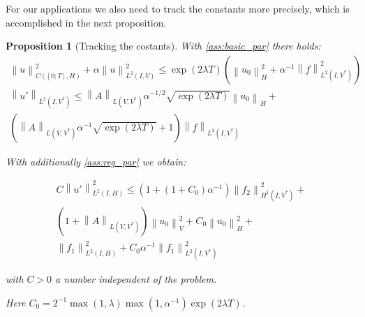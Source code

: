 \documentclass[english,a4paper,10pt,oneside]{scrbook}	%
\theoremstyle{break}
\newtheorem{prop}[equation]{Proposition}
\theoremstyle{remark}
\newcommand{\ds}{\displaystyle}
\newcommand{\norm}[1]{\left\lVert#1\right\rVert}
\newcommand{\HN}[1]{\norm{#1}_{H}}
\newcommand{\VN}[1]{\norm{#1}_{V}}
\begin{document}
For our applications we also need to track the constants more precisely, which is accomplished in the next proposition.

\begin{prop}[Tracking the costants]
\label{thm:const_track}
With \cref{ass:basic_par} there holds:
\begin{align}
\norm{u}^2_{C([0;T],H)}+\alpha\norm{u}_{L^2(I,V)}^2\leq \exp(2\lambda T)(\HN{u_0}^2+\alpha^{-1}\norm{f}^2_{L^2(I,V^*)})\\
\norm{u'}_{L^2(I,V^*)}\leq \norm{A}_{L(V,V^*)}\alpha^{-1/2}\sqrt{\exp(2\lambda T)}\HN{u_0} +\\\left (\norm{A}_{L(V,V^*)}\alpha^{-1}\sqrt{\exp(2\lambda T)}+1\right ) \norm{f}_{L^2(I,V^*)}
\end{align}

With additionally \cref{ass:reg_par} we obtain:

\begin{align}
C\norm{u'}^2_{L^2(I,H)}\leq 
(1+(1+C_0)\alpha^{-1})\norm{f_2}_{H^1(I,V^*)}^2+\\
(1+\norm{A}_{L(V,V^*)})\VN{u_{0}}^2+C_0\HN{u_0}^2+\\
\norm{f_1}_{L^2(I,H)}^2+C_0\alpha^{-1}\norm{f_1}^2_{L^2(I,V^*)}
\end{align}

with $C>0$ a number independent of the problem.

Here $C_0 = \ds 2^{-1}\max(1,\lambda)\max(1,\alpha^{-1})\exp(2\lambda T)$.

\end{prop}
\end{document}
